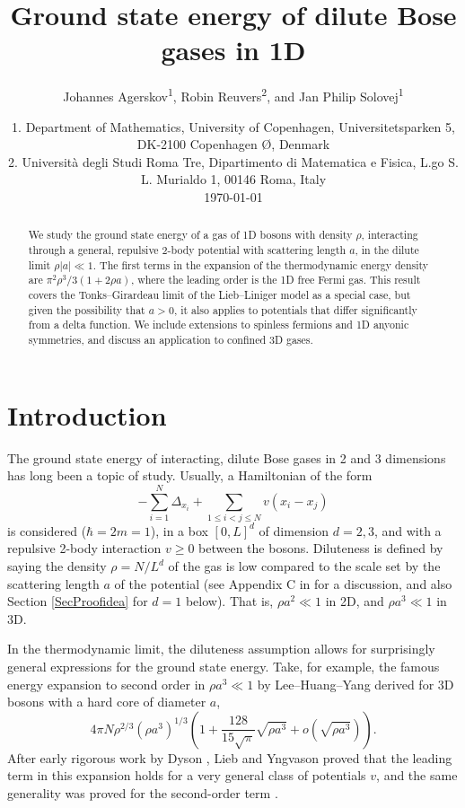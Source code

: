 \documentclass[a4paper,11pt]{article}
\author{Johannes Agerskov\textsuperscript{1}\orcidlink{0000-0002-0533-3221}, Robin Reuvers\textsuperscript{2}\orcidlink{0000-0003-2949-3614}, and Jan Philip Solovej\textsuperscript{1}\orcidlink{0000-0002-0244-1497}}
\date{
1. Department of Mathematics, University of Copenhagen, Universitetsparken 5, DK-2100 Copenhagen \O, Denmark
	\\
2. Universit\`{a} degli Studi Roma Tre, Dipartimento di Matematica e Fisica, L.go S. L. Murialdo 1, 00146 Roma, Italy\\
	\today}
\title{Ground state energy of dilute Bose gases in 1D}
\numberwithin{equation}{section}
\begin{document}
\maketitle
\begin{abstract}
We study the ground state energy of a gas of 1D bosons with density $\rho$, interacting through a general, repulsive 2-body potential with scattering length $a$, in the dilute limit $\rho |a|\ll1$. The first terms in the expansion of the thermodynamic energy density are $\pi^2\rho^3/3(1+2\rho a)$, where the leading order is the 1D free Fermi gas. This result covers the Tonks--Girardeau limit of the Lieb--Liniger model as a special case, but given the possibility that $a>0$, it also applies to potentials that differ significantly from a delta function. We include extensions to spinless fermions and 1D anyonic symmetries, and discuss an application to confined 3D gases.
\end{abstract}


\section{Introduction}
The ground state energy of interacting, dilute Bose gases in 2 and 3 dimensions has long been a topic of study. Usually, a Hamiltonian of the form 
\begin{equation}
\label{Hgeneral}
-\sum^N_{i=1}\Delta_{x_i}+\sum_{1\leq i<j\leq N}v(x_i-x_j)
\end{equation}
is considered ($\hbar=2m=1$), in a box $[0,L]^d$ of dimension $d=2,3$, and with a repulsive 2-body interaction $v\geq0$ between the bosons. Diluteness is defined by saying the density $\rho=N/L^d$ of the gas is low compared to the scale set by the scattering length $a$ of the potential (see Appendix C in \cite{lieb2006mathematics} for a discussion, and also Section \ref{SecProofidea} for $d=1$ below). That is, $\rho a^2\ll1$ in 2D, and $\rho a^3\ll1$ in 3D.

In the thermodynamic limit, the diluteness assumption allows for surprisingly general expressions for the ground state energy. Take, for example, the famous energy expansion to second order in $\rho a^3\ll1$ by Lee--Huang--Yang \cite{lee1957eigenvalues} derived for 3D bosons with a hard core of diameter $a$,
\begin{equation}
\label{result3D}
4\pi N\rho^{2/3} (\rho a^3)^{1/3}\left(1+\frac{128}{15\sqrt{\pi}}\sqrt{\rho a^3}+o\left(\sqrt{\rho a^3}\right)\right).
\end{equation}
After early rigorous work by Dyson \cite{dyson1957ground}, Lieb and Yngvason \cite{lieb1998ground} proved that the leading term in this expansion holds for a very general class of potentials $v$, and the same generality was proved for the second-order term \cite{yau2009second,fournais2020energy,basti2021new,fournais2021energy}.
\end{document}
